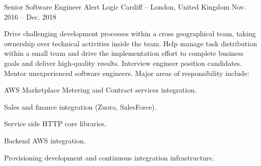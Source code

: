 \begin{cventries}
  \cventry
    {Senior Software Engineer} %
    {Alert Logic} %
    {Cardiff -- London, United Kingdom} %
    {Nov. 2016 – Dec. 2018} %
    {
      \responsibilities
        {Drive challenging development processes within a cross
        geographical team, taking ownership over technical activities
        inside the team. Help manage task distribution within a small
        team and drive the implementation effort to complete business
        goals and deliver high-quality results. Interview engineer
        position candidates. Mentor unexperienced software
        engineers. Major areas of responsibility include:}
      \begin{cvitems} %
        \item {AWS Marketplace Metering and Contract services integration.}
        \item {Sales and finance integration (Zuora, SalesForce).}
        \item {Service side HTTP core libraries.}
        \item {Backend AWS integration.}
        \item {Provisioning development and continuous integration infrastructure.}
      \end{cvitems}
    }


\end{cventries}
